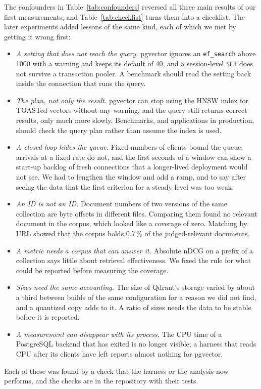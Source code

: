 \documentclass[preprint,12pt]{elsarticle}
\begin{document}
The confounders in Table~\ref{tab:confounders} reversed all three main
results of our first measurements, and Table~\ref{tab:checklist} turns them into a checklist. The later experiments added lessons of the same kind, each of which we met by
getting it wrong first:
\begin{itemize}
  \item \emph{A setting that does not reach the query.} pgvector ignores an \texttt{ef\_search} above 1000 with a warning and keeps its default of 40, and
    a session-level \texttt{SET} does not survive a transaction pooler. A benchmark should read the setting back inside the connection that runs the query.
  \item \emph{The plan, not only the result.} pgvector can stop using the HNSW index for TOASTed vectors without any warning, and the query still returns correct results, only much more slowly.
    Benchmarks, and applications in production, should check the query plan rather than assume the index is used.
  \item \emph{A closed loop hides the queue.} Fixed numbers of clients bound the queue; arrivals at a fixed rate do not, and the first seconds of a window can show a start-up backlog of fresh connections
    that a longer-lived deployment would not see. We had to lengthen the window and add a ramp, and to say after seeing the data that the first criterion for a steady level was too weak.
  \item \emph{An ID is not an ID.} Document numbers of two versions of the same collection are byte offsets in different files. Comparing them found no relevant document in the corpus, which looked like a coverage of zero.
    Matching by URL showed that the corpus holds 0.7\,\% of the judged-relevant documents.
  \item \emph{A metric needs a corpus that can answer it.} Absolute nDCG on a prefix of a collection says little about retrieval effectiveness. We fixed the rule for what could be reported before measuring the coverage.
  \item \emph{Sizes need the same accounting.} The size of Qdrant's storage varied by about a third between builds of the same configuration for a reason we did not find, and a quantized copy adds to it. A ratio of sizes needs the data to be stable
    before it is reported.
  \item \emph{A measurement can disappear with its process.} The CPU time of a PostgreSQL backend that has exited is no longer visible; a harness that reads CPU after its clients have left reports almost nothing for pgvector.
\end{itemize}
Each of these was found by a check that the harness or the analysis now performs, and the checks are in the repository with their tests.
\end{document}
